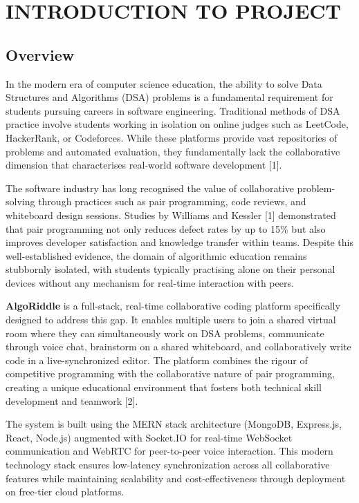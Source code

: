 \chapter{INTRODUCTION TO PROJECT}

\section{Overview}

In the modern era of computer science education, the ability to solve Data Structures and Algorithms (DSA) problems is a fundamental requirement for students pursuing careers in software engineering. Traditional methods of DSA practice involve students working in isolation on online judges such as LeetCode, HackerRank, or Codeforces. While these platforms provide vast repositories of problems and automated evaluation, they fundamentally lack the collaborative dimension that characterises real-world software development [1].

The software industry has long recognised the value of collaborative problem-solving through practices such as pair programming, code reviews, and whiteboard design sessions. Studies by Williams and Kessler [1] demonstrated that pair programming not only reduces defect rates by up to 15\% but also improves developer satisfaction and knowledge transfer within teams. Despite this well-established evidence, the domain of algorithmic education remains stubbornly isolated, with students typically practising alone on their personal devices without any mechanism for real-time interaction with peers.

\textbf{AlgoRiddle} is a full-stack, real-time collaborative coding platform specifically designed to address this gap. It enables multiple users to join a shared virtual room where they can simultaneously work on DSA problems, communicate through voice chat, brainstorm on a shared whiteboard, and collaboratively write code in a live-synchronized editor. The platform combines the rigour of competitive programming with the collaborative nature of pair programming, creating a unique educational environment that fosters both technical skill development and teamwork [2].

The system is built using the MERN stack architecture (MongoDB, Express.js, React, Node.js) augmented with Socket.IO for real-time WebSocket communication and WebRTC for peer-to-peer voice interaction. This modern technology stack ensures low-latency synchronization across all collaborative features while maintaining scalability and cost-effectiveness through deployment on free-tier cloud platforms.

